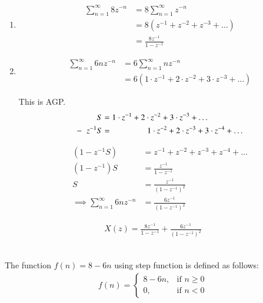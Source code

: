 \documentclass[journal,12pt,twocolumn]{IEEEtran}
\theoremstyle{remark}
\begin{document}
\begin{enumerate}

    \item 
    \begin{align}
        \sum_{n=1}^{\infty} 8z^{-n} &= 8\sum_{n=1}^{\infty} z^{-n}\\
        &=8(z^{-1}+z^{-2}+z^{-3}+\dots)\\
        &=\frac{8z^{-1}}{1-z^{-1}}
    \end{align}
    
    \item 
    \begin{align}
        \sum_{n=1}^{\infty} 6nz^{-n} &= 6\sum_{n=1}^{\infty}nz^{-n}\\
        &=6(1\cdot z^{-1} + 2\cdot z^{-2} + 3\cdot z^{-3} + \dots)
    \end{align}
    
    This is AGP.
    \begin{align}
        S&=1\cdot z^{-1}+2\cdot z^{-2}+3\cdot z^{-3}+\dots\\
        -\hspace{2mm}z^{-1}S&=\hspace{1.5cm}1\cdot z^{-2}+2\cdot z^{-3}+3\cdot z^{-4}+\dots
    \end{align}
    
    \hrulefill

    \begin{align}
        (1-z^{-1}S)&=z^{-1}+z^{-2}+z^{-3}+z^{-4}+\dots\\
        (1-z^{-1})S&=\frac{z^{-1}}{1-z^{-1}}\\
        S&=\frac{z^{-1}}{(1-z^{-1})^{2}}\\
        \implies \sum_{n=1}^{\infty}6nz^{-n}&=\frac{6z^{-1}}{(1-z^{-1})^{2}}
    \end{align}
\end{enumerate}
    \begin{align}
        X(z)=\frac{8z^{-1}}{1-z^{-1}}+\frac{6z^{-1}}{(1-z^{-1})^{2}}
    \end{align}\

The function $f(n) = 8 - 6n$ using step function is defined as follows:
\begin{align}
    f(n) = 
    \begin{cases}
        8 - 6n, & \text{if } n \geq 0 \\
        0, & \text{if } n < 0
    \end{cases}
\end{align}
\end{document}
